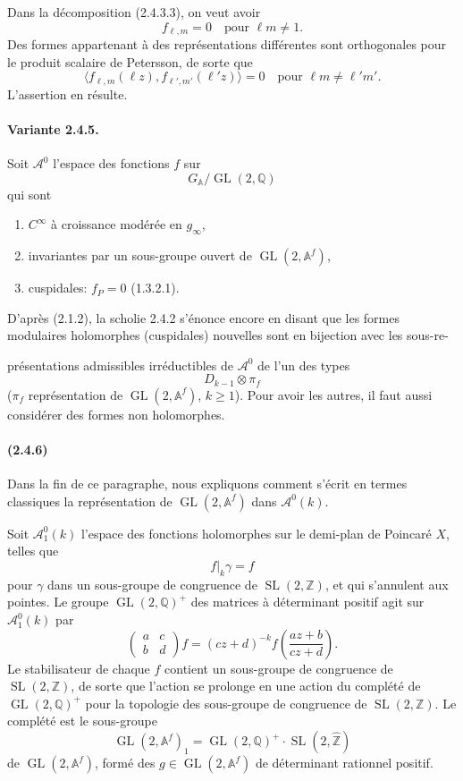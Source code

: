 \documentclass[10pt,a4paper]{article}
\providecommand{\GL}{\operatorname{GL}}
\providecommand{\SL}{\operatorname{SL}}
\providecommand{\Q}{\mathbb Q}
\providecommand{\Z}{\mathbb Z}
\providecommand{\A}{\mathbb A}
\providecommand{\Af}{\mathbb A^f}
\begin{document}
Dans la décomposition (2.4.3.3), on veut avoir
\[
f_{\ell,m}=0\quad\text{pour }\ell m\ne1.
\]
Des formes appartenant à des représentations différentes sont orthogonales pour le produit scalaire de Petersson, de sorte que
\[
\langle f_{\ell,m}(\ell z),f_{\ell',m'}(\ell' z)\rangle=0
\quad\text{pour }\ell m\ne \ell' m'.
\]
L'assertion en résulte.

\paragraph{Variante 2.4.5.} Soit \(\mathcal A^0\) l'espace des fonctions \(f\) sur
\[
G_{\A}/\GL(2,\Q)
\]
qui sont
\begin{enumerate}[label=(\alph*)]
\item \(C^\infty\) à croissance modérée en \(g_\infty\),
\item invariantes par un sous-groupe ouvert de \(\GL(2,\Af)\),
\item cuspidales: \(f_P=0\) (1.3.2.1).
\end{enumerate}

D'après (2.1.2), la scholie 2.4.2 s'énonce encore en disant que les formes modulaires holomorphes (cuspidales) nouvelles sont en bijection avec les sous-re-

\clearpage
{}
\hypertarget{authority-33}{}
présentations admissibles irréductibles de \(\mathcal A^0\) de l'un des types
\[
D_{k-1}\otimes\pi_f
\]
(\(\pi_f\) représentation de \(\GL(2,\Af)\), \(k\ge1\)). Pour avoir les autres, il faut aussi considérer des formes non holomorphes.

\paragraph{(2.4.6)} Dans la fin de ce paragraphe, nous expliquons comment s'écrit en termes classiques la représentation de \(\GL(2,\Af)\) dans \(\mathcal A^0(k)\).

Soit \(\mathcal A_1^0(k)\) l'espace des fonctions holomorphes sur le demi-plan de Poincaré \(X\), telles que
\[
f|_k\gamma=f
\]
pour \(\gamma\) dans un sous-groupe de congruence de \(\SL(2,\Z)\), et qui s'annulent aux pointes. Le groupe \(\GL(2,\Q)^+\) des matrices à déterminant positif agit sur \(\mathcal A_1^0(k)\) par
\[
\begin{pmatrix}a&c\\ b&d\end{pmatrix}f
=
(cz+d)^{-k}f\!\left(\frac{az+b}{cz+d}\right).
\]
Le stabilisateur de chaque \(f\) contient un sous-groupe de congruence de \(\SL(2,\Z)\), de sorte que l'action se prolonge en une action du complété de \(\GL(2,\Q)^+\) pour la topologie des sous-groupe de congruence de \(\SL(2,\Z)\). Le complété est le sous-groupe
\[
\GL(2,\Af)_1=\GL(2,\Q)^+\cdot\SL(2,\widehat{\Z})
\]
de \(\GL(2,\Af)\), formé des \(g\in\GL(2,\Af)\) de déterminant rationnel positif.
\end{document}
